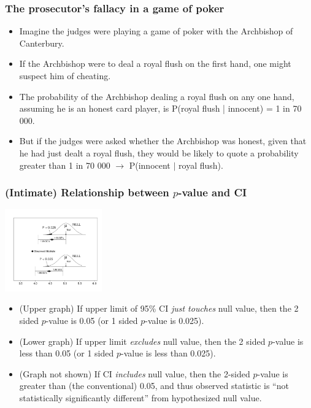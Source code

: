 \documentclass[10pt]{beamer}\usepackage[]{graphicx}\usepackage[]{color}
\begin{document}
\begin{frame}
	\frametitle{The prosecutor's fallacy in a game of poker}
	
	\begin{itemize}
		\setlength\itemsep{1em}
		\item  Imagine the judges were playing a game of poker with the Archbishop of Canterbury. 
		\item If the Archbishop were to deal a royal flush on the first hand, one might suspect him of cheating. \pause 
		\item The probability of the Archbishop dealing a royal flush on any one hand, assuming he is an honest card player, is P(royal flush | innocent) = 1 in 70 000. \pause 
		\item But if the judges were asked whether the Archbishop was honest, given that he had just dealt a royal flush, they would be likely to quote a probability greater than 1 in 70 000 $\to$ P(innocent $|$ royal flush). 
	\end{itemize}
	
\end{frame}


\begin{frame}
	\frametitle{(Intimate) Relationship between $p$-value and CI}
	\begin{center}
		\includegraphics[width=1.65in]{P-CI.pdf}
	\end{center} 
	\begin{footnotesize}
		\begin{itemize}
			\item
			(Upper graph) If upper limit of 95\% CI\textit{ just touches} null value, then
			the 2 sided $p$-value is 0.05 (or 1 sided $p$-value is 0.025). \pause
			\item
			(Lower graph) If upper limit \textit{excludes} null value, then
			the 2 sided $p$-value is less than 0.05 (or 1 sided $p$-value is less than 0.025). \pause
			\item
			(Graph not shown) If  CI \textit{includes} null value, then the 2-sided $p$-value is greater than (the conventional) 0.05, and thus observed statistic is ``not statistically significantly different'' from hypothesized null value. 
		\end{itemize}
	\end{footnotesize}
\end{frame}
\end{document}
